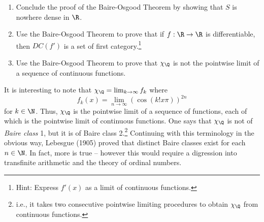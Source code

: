 \documentclass{homework}
\begin{document}
\begin{Exercise}
\begin{enumerate}
    \begin{solution}

    \end{solution}

  \item Conclude the proof of the Baire-Osgood Theorem by showing
    that $S$ is nowhere dense in $\R$.

    \begin{solution}

    \end{solution}

  \item Use the Baire-Osgood Theorem to prove that if $f:\R\to\R$ is
    differentiable, then $DC(f')$ is a set of first
    category.\footnote{Hint: Express $f'(x)$ as a limit of
      continuous functions.}

    \begin{solution}

    \end{solution}

  \item Use the Baire-Osgood Theorem to prove that $\chi_{\Q}$ is not
    the pointwise limit of a sequence of continuous functions.

    \begin{solution}

    \end{solution}
  \end{enumerate}
	It is interesting to note that $\chi_{\Q} = \lim_{k \to \infty} f_k$
  where
	$$f_k(x) = \lim_{n\to\infty} ( \cos (k!x \pi ) )^{2n}$$ for $k \in \N$.  Thus, $\chi_{\Q}$ is the pointwise limit
	of a sequence of functions, each of which is the pointwise limit of
  continuous functions.  One says that $\chi_{\Q}$ is not of
  \emph{Baire class} 1, but it is of Baire class 2.\footnote{i.e., it
    takes two consecutive pointwise limiting procedures to obtain
    $\chi_{\Q}$ from continuous functions.}  Continuing with this
  terminology in the obvious way, Lebesgue (1905) proved that distinct
  Baire classes exist for each $n\in \N$.  In fact, more is true --
  however this would require a digression into transfinite arithmetic
  and the theory of ordinal numbers.
\end{Exercise}
\end{document}

